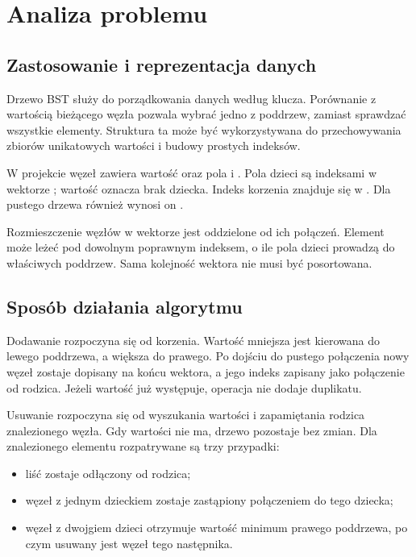 \clearpage
\section{Analiza problemu}
\label{sec:analiza}

\subsection{Zastosowanie i reprezentacja danych}

Drzewo BST służy do porządkowania danych według klucza.
Porównanie z wartością bieżącego węzła pozwala wybrać jedno
z poddrzew, zamiast sprawdzać wszystkie elementy.
Struktura ta może być wykorzystywana do przechowywania zbiorów
unikatowych wartości i budowy prostych indeksów.

W projekcie węzeł  zawiera wartość 
oraz pola  i . Pola dzieci są indeksami
w wektorze ; wartość  oznacza brak dziecka.
Indeks korzenia znajduje się w .
Dla pustego drzewa również wynosi on .

Rozmieszczenie węzłów w wektorze jest oddzielone od ich połączeń.
Element może leżeć pod dowolnym poprawnym indeksem, o ile pola
dzieci prowadzą do właściwych poddrzew. Sama kolejność wektora
nie musi być posortowana.

\subsection{Sposób działania algorytmu}

Dodawanie rozpoczyna się od korzenia. Wartość mniejsza jest kierowana
do lewego poddrzewa, a większa do prawego. Po dojściu do pustego
połączenia nowy węzeł zostaje dopisany na końcu wektora,
a jego indeks zapisany jako połączenie od rodzica.
Jeżeli wartość już występuje, operacja nie dodaje duplikatu.

Usuwanie rozpoczyna się od wyszukania wartości i zapamiętania
rodzica znalezionego węzła. Gdy wartości nie ma, drzewo pozostaje
bez zmian. Dla znalezionego elementu rozpatrywane są trzy przypadki:
\begin{itemize}
  \item liść zostaje odłączony od rodzica;
  \item węzeł z jednym dzieckiem zostaje zastąpiony połączeniem
        do tego dziecka;
  \item węzeł z dwojgiem dzieci otrzymuje wartość minimum prawego
        poddrzewa, po czym usuwany jest węzeł tego następnika.
\end{itemize}

